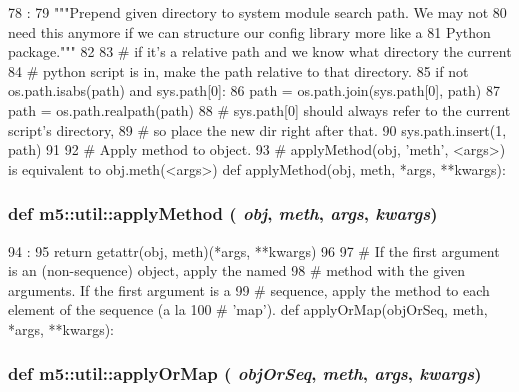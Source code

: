 \begin{DoxyCode}
78                    :
79     """Prepend given directory to system module search path.  We may not
80     need this anymore if we can structure our config library more like a
81     Python package."""
82 
83     # if it's a relative path and we know what directory the current
84     # python script is in, make the path relative to that directory.
85     if not os.path.isabs(path) and sys.path[0]:
86         path = os.path.join(sys.path[0], path)
87     path = os.path.realpath(path)
88     # sys.path[0] should always refer to the current script's directory,
89     # so place the new dir right after that.
90     sys.path.insert(1, path)
91 
92 # Apply method to object.
93 # applyMethod(obj, 'meth', <args>) is equivalent to obj.meth(<args>)
def applyMethod(obj, meth, *args, **kwargs):
\end{DoxyCode}
\hypertarget{namespacem5_1_1util_ab1c0a698e0ba669fe3ef6c18e4c93f65}{
\subsubsection[{applyMethod}]{\setlength{\rightskip}{0pt plus 5cm}def m5::util::applyMethod ( {\em obj}, \/   {\em meth}, \/   {\em args}, \/   {\em kwargs})}}
\label{namespacem5_1_1util_ab1c0a698e0ba669fe3ef6c18e4c93f65}



\begin{DoxyCode}
94                                            :
95     return getattr(obj, meth)(*args, **kwargs)
96 
97 # If the first argument is an (non-sequence) object, apply the named
98 # method with the given arguments.  If the first argument is a
99 # sequence, apply the method to each element of the sequence (a la
100 # 'map').
def applyOrMap(objOrSeq, meth, *args, **kwargs):
\end{DoxyCode}
\hypertarget{namespacem5_1_1util_a7334481c369897a3fdc6df753972f5f8}{
\subsubsection[{applyOrMap}]{\setlength{\rightskip}{0pt plus 5cm}def m5::util::applyOrMap ( {\em objOrSeq}, \/   {\em meth}, \/   {\em args}, \/   {\em kwargs})}}
\label{namespacem5_1_1util_a7334481c369897a3fdc6df753972f5f8}



